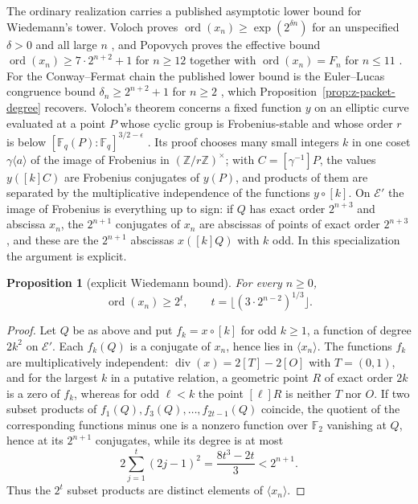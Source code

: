 \documentclass[11pt]{article}
\newtheorem{proposition}[theorem]{Proposition}
\theoremstyle{definition}
\theoremstyle{remark}
\begin{document}
The ordinary realization carries a published asymptotic lower bound for
Wiedemann's tower.  Voloch proves $\operatorname{ord}(x_n)\geq\exp(2^{\delta n})$
for an unspecified $\delta>0$ and all large $n$ \cite{voloch2010}, and
Popovych proves the effective bound
$\operatorname{ord}(x_n)\geq7\cdot2^{n+2}+1$ for $n\geq12$ together with
$\operatorname{ord}(x_n)=F_n$ for $n\leq11$
\cite[Theorem~3]{popovych2015}.  For the Conway--Fermat chain the published
lower bound is the Euler--Lucas congruence bound
$\delta_n\geq2^{n+2}+1$ for $n\geq2$
\cite{popovych2018,caglierohermanszechtman2025}, which
Proposition~\ref{prop:z-packet-degree} recovers.  Voloch's theorem concerns
a fixed function $y$ on an elliptic curve evaluated at a point $P$ whose
cyclic group is Frobenius-stable and whose order $r$ is below
$[\mathbb F_q(P):\mathbb F_q]^{3/2-\epsilon}$
\cite[Theorem~4.1]{voloch2010}.  Its proof chooses many small integers $k$
in one coset $\gamma\langle a\rangle$ of the image of Frobenius in
$(\mathbb Z/r\mathbb Z)^{\times}$; with $C=[\gamma^{-1}]P$, the values
$y([k]C)$ are Frobenius conjugates of $y(P)$, and products of them are
separated by the multiplicative independence of the functions $y\circ[k]$.
On $\mathcal E'$ the image of Frobenius is everything up to sign: if $Q$ has
exact order $2^{n+3}$ and abscissa $x_n$, the $2^{n+1}$ conjugates of $x_n$
are abscissas of points of exact order $2^{n+3}$, and these are the
$2^{n+1}$ abscissas $x([k]Q)$ with $k$ odd.  In this specialization the
argument is explicit.

\begin{proposition}[explicit Wiedemann bound]\label{prop:z-wiedemann-bound}
For every $n\geq0$,
\[
 \operatorname{ord}(x_n)\geq2^t,
 \qquad t=\bigl\lfloor(3\cdot2^{n-2})^{1/3}\bigr\rfloor.
\]
\end{proposition}

\begin{proof}
Let $Q$ be as above and put $f_k=x\circ[k]$ for odd $k\geq1$, a function of
degree $2k^2$ on $\mathcal E'$.  Each $f_k(Q)$ is a conjugate of $x_n$, hence
lies in $\langle x_n\rangle$.  The functions $f_k$ are multiplicatively
independent: $\operatorname{div}(x)=2[T]-2[O]$ with $T=(0,1)$, and for the
largest $k$ in a putative relation, a geometric point $R$ of exact order $2k$
is a zero of $f_k$, whereas for odd $\ell<k$ the point $[\ell]R$ is neither
$T$ nor $O$.  If two subset products of $f_1(Q),f_3(Q),\ldots,f_{2t-1}(Q)$
coincide, the quotient of the corresponding functions minus one is a nonzero
function over $\mathbb F_2$ vanishing at $Q$, hence at its $2^{n+1}$
conjugates, while its degree is at most
\[
 2\sum_{j=1}^{t}(2j-1)^2=\frac{8t^3-2t}{3}<2^{n+1}.
\]
Thus the $2^t$ subset products are distinct elements of
$\langle x_n\rangle$.
\end{proof}
\end{document}
